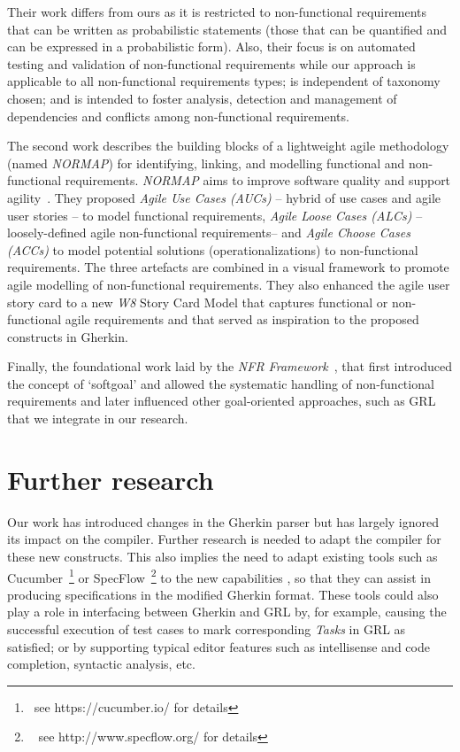 \documentclass[dissertation,final]{softeng}
\newcommand{\nfrs}{non-functional requirements\xspace}
\begin{document}
Their work differs from ours as it is restricted to \nfrs that can be written as probabilistic statements (those that can be quantified and can be expressed in a probabilistic form). Also, their focus is on automated testing and validation of \nfrs while our approach is applicable to all \nfrs types; is independent of taxonomy chosen; and is intended to foster analysis, detection and management of dependencies and conflicts among \nfrs.

The second work describes the building blocks of a lightweight agile methodology (named \emph{NORMAP}) for identifying, linking, and modelling functional and non-functional requirements. \emph{NORMAP} aims to improve software quality and support agility~\citep{Farid1998}. They proposed \emph{Agile Use Cases (AUCs)} --  hybrid of use cases and agile user stories -- to model functional requirements, \emph{Agile Loose Cases (ALCs)} -- loosely-defined agile \nfrs --  and \emph{Agile Choose Cases (ACCs)} to model potential solutions (operationalizations) to \nfrs. The three artefacts are combined in a visual framework to promote agile modelling of \nfrs. They also enhanced the agile user story card to a new \emph{W8} Story Card Model that captures functional or non-functional agile requirements and that served as inspiration to the proposed constructs in Gherkin.

Finally, the foundational work laid by the \emph{NFR Framework}~\citep{Chung2000}, that first introduced the concept of `softgoal' and allowed the systematic handling of \nfrs and later influenced other goal-oriented approaches, such as GRL~\citep{Amyot2003} that we integrate in our research.

\section{Further research}
Our work has introduced changes in the Gherkin parser but has largely ignored its impact on the compiler. Further research is needed to adapt the compiler for these new constructs. This also implies the need to adapt existing tools such as Cucumber~\footnote{~see https://cucumber.io/ for details} or SpecFlow~\footnote{~ see http://www.specflow.org/ for details} to the new capabilities , so that they can assist in producing specifications in the modified Gherkin format. These tools could also play a role in interfacing between Gherkin and GRL by, for example, causing the successful execution of test cases to mark corresponding \emph{Tasks} in GRL as satisfied; or by supporting typical editor features such as intellisense and code completion, syntactic analysis, etc.
\end{document}
